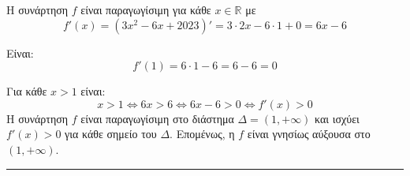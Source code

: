 \begin{alist}
\item Η συνάρτηση $f$ είναι παραγωγίσιμη για κάθε $x \in \mathbb{R}$ με
\[ f'(x) = (3x^2 - 6x + 2023)' = 3 \cdot 2x - 6 \cdot 1 + 0 = 6x - 6 \]
\item Είναι:
\[ f'(1) = 6 \cdot 1 - 6 = 6 - 6 = 0 \]
\item Για κάθε $x > 1$ είναι:
\[ x > 1 \Leftrightarrow 6x > 6 \Leftrightarrow 6x - 6 > 0 \Leftrightarrow f'(x) > 0 \]
Η συνάρτηση $f$ είναι παραγωγίσιμη στο διάστημα $\Delta = (1, +\infty)$ και ισχύει $f'(x) > 0$ για κάθε σημείο του $\Delta$. Επομένως, η $f$ είναι γνησίως αύξουσα στο $(1, +\infty)$.
\end{alist}
\vspace{6mm}
\noindent\rule{\textwidth}{0.4pt}
\vspace{6mm}

